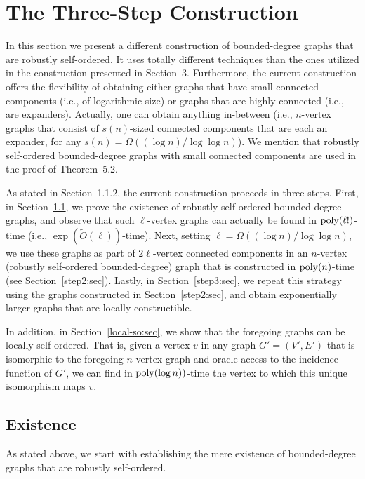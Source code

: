 \documentclass[10pt,a4paper]{article}
\theoremstyle{definition}
\newcommand{\tildeO}{{\widetilde{O}}}
\newcommand{\poly}{{\rm poly}}
\begin{document}
\setcounter{section}{3}\section{The Three-Step Construction}
\label{three-step:sec}
In this section we present a different construction
of bounded-degree graphs that are robustly self-ordered.
It uses totally different techniques than the ones utilized
in the construction presented in Section~3.
Furthermore, the current construction offers the flexibility
of obtaining either graphs that have small connected components
(i.e., of logarithmic size)
or graphs that are highly connected (i.e., are expanders).
Actually, one can obtain anything in-between
(i.e., $n$-vertex graphs that consist of $s(n)$-sized
connected components that are each an expander,
for any $s(n)=\Omega((\log n)/\log\log n)$).
We mention that robustly self-ordered bounded-degree graphs
with small connected components are used in the proof
of Theorem~5.2.

As stated in Section~1.1.2,
the current construction proceeds in three steps.
First, in Section~\ref{step1:sec}, we prove the existence
of robustly self-ordered bounded-degree graphs,
and observe that such $\ell$-vertex graphs can actually
be found in $\poly(\ell!)$-time (i.e., $\exp(\tildeO(\ell))$-time).
Next, setting $\ell=\Omega((\log n)/\log\log n)$,
we use these graphs as part of $2\ell$-vertex
connected components in an $n$-vertex
(robustly self-ordered bounded-degree)
graph that is constructed in $\poly(n)$-time
(see Section~\ref{step2:sec}).
Lastly, in Section~\ref{step3:sec},
we repeat this strategy using the graphs
constructed in Section~\ref{step2:sec},
and obtain exponentially larger graphs
that are locally constructible.

%
%
In addition, in Section~\ref{local-so:sec},
we show that the foregoing graphs can be locally self-ordered.
That is, given a vertex $v$ in any graph $G'=(V',E')$
that is isomorphic to the foregoing $n$-vertex graph
and oracle access to the incidence function of $G'$,
we can find in $\poly(\log n))$-time the vertex
to which this unique isomorphism maps $v$.
%

%
%
%
%
%
%
%

\subsection{Existence}
\label{step1:sec}
As stated above, we start with establishing the mere existence
of bounded-degree graphs that are robustly self-ordered.
\end{document}
